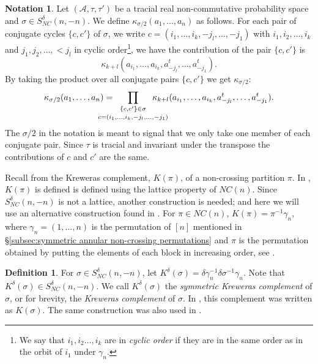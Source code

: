 \documentclass[11pt]{amsart}
\theoremstyle{definition}
\newtheorem{definition}[theorem]{Definition}
\newtheorem{notation}[theorem]{Notation}
\numberwithin{theorem}{section}
\newcommand{\cA}{\mathcal{A}}
\newcommand{\NC}{\mathit{NC}}
\begin{document}
\begin{notation}\label{notation:sncdelta}
Let $(\cA, \tau, \tau')$ be a tracial real non-commutative
probability space and $\sigma \in S_\NC^\delta(n, -n)$. We
define $ \kappa_{\sigma/2}(a_1, \dots, a_n) $ as
follows. For each pair of conjugate cycles $\{ c, c'\}$ of
$\sigma$, we write $c = (i_1, \dots, i_k, -j_l, \dots,
-j_1)$ with $i_1, i_2, \dots, i_k$ and $j_1, j_2, \dots, <
j_l$ in cyclic order\footnote{We say that $i_1 , i_2 \dots,
i_k$ are in \textit{cyclic order} if they are in the same
order as in the orbit of $i_1$ under $\gamma_n$.}, we have
the contribution of the pair $\{c, c'\}$ is
\[
\kappa_{k+l}(a_{i_1}, \dots, a_{i_k}, a_{-j_l}^t, \dots, a_{-j_1}^t).
\]
By taking the product over all conjugate pairs $\{c, c'\}$ we get $\kappa_{\sigma/2}$: 
\[
\kappa_{\sigma/2}(a_1, \dots, a_n)
= \kern-2em
\mathop{\prod_{\{c, c'\} \in \sigma}}_{c = (i_1, \dots, i_k, -j_{l}, \dots, -j_1)}
\kern-2em
\kappa_{k+l}(a_{i_1}, \dots, a_{i_k}, a_{-j_l}^t, \dots, a_{-j_1}^t).
\]
The $\sigma/2$ in the notation is meant to signal that we
only take one member of each conjugate pair. Since $\tau$ is
tracial and invariant under the transpose the contributions
of $c$ and $c'$ are the same.
\end{notation}

Recall from \cite[Def. 9.21]{ns} the Kreweras complement,
$K(\pi)$, of a non-crossing partition $\pi$. In \cite{ns},
$K(\pi)$ is defined is defined using the lattice property of
$\NC(n)$. Since $S_\NC^\delta(n, -n)$ is not a lattice,
another construction is needed; and here we will use an
alternative construction found in \cite{ns}. For $\pi \in
\NC(n)$, $K(\pi) = \pi^{-1}\gamma_n$, where $\gamma_n =(1,
\dots, n)$ is the permutation of $[n]$ mentioned in
\S\ref{subsec:symmetric annular non-crossing permutations}
and $\pi$ is the permutation obtained by putting the
elements of each block in increasing order, see
\cite[Ex. 18.25]{ns}.

\begin{definition}\label{def:symmetric kreweras complement}
For $\sigma \in S_\NC^\delta(n, -n)$, let $K^\delta(\sigma)
= \delta\gamma^{-1}_n\delta \sigma^{-1} \gamma_n$. Note that
$K^\delta(\sigma) \in S_\NC^\delta(n, -n)$. We call
$K^\delta(\sigma)$ the \textit{symmetric Kreweras
  complement} of $\sigma$, or for brevity, the
\textit{Kreweras complement} of $\sigma$. In \cite[Notation
  23]{mvb}, this complement was written as $K(\sigma)$. The
same construction was also used in \cite{r}.
\end{definition}
\end{document}
